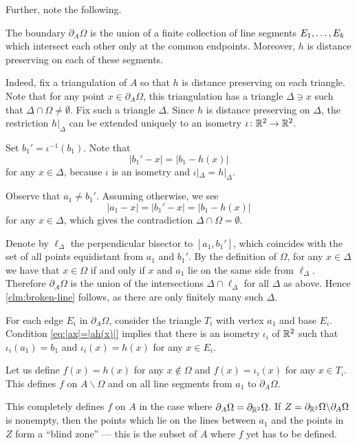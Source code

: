 Further, note the following.
\begin{clm}{}\label{clm:broken-line}
The boundary $\partial_A\Omega$ is the union of a finite collection of line segments
$E_1,\z\dots, E_k$ which intersect each other only at the common endpoints. Moreover, $h$ is distance preserving on each of these segments.
\end{clm}

Indeed, fix a triangulation of $A$ so that $h$ is distance preserving on each triangle.
Note that for any point $x\in \partial_A\Omega$, this triangulation has a triangle $\Delta\ni x$ such that $\Delta\cap\Omega\ne\emptyset$.
Fix such a triangle $\Delta$.
Since $h$ is distance preserving on $\Delta$, 
the restriction $h|_\Delta$ can be extended uniquely to an isometry $\iota\:\RR^2\z\to\RR^2$.

Set $b_1'=\iota^{-1}(b_1)$.
Note that 
\[|b_1'-x|=|b_1-h(x)|\] 
for any $x\in\Delta$, because $\iota$ is an isometry and $\iota|_\Delta = h|_\Delta$.

Observe that $a_1\ne b_1'$.
Assuming otherwise, we see $$|a_1-x|=|b_1'-x|=|b_1-h(x)|$$ for any $x\in\Delta$, which gives the contradiction $\Delta\cap\Omega=\emptyset$.

Denote by $\ell_\Delta$ the perpendicular bisector to $[a_1, b_1']$, which coincides with the set of all points equidistant from $a_1$ and $b_1'$.
By the definition of $\Omega$, for any $x\in \Delta$ we have that
$x\in\Omega$ if and only if $x$ and $a_1$ lie on the same side from $\ell_\Delta$.
Therefore $\partial_A\Omega$ is the union of the intersections $\Delta\cap\ell_\Delta$ for all $\Delta$ as above. 
Hence \ref{clm:broken-line} follows, as there are only finitely many such $\Delta$.

For each edge $E_i$ in  $\partial_A\Omega$, consider the triangle $T_i$ with vertex $a_1$ and base $E_i$.
Condition \ref{eq:|ax|=|ah(x)|} implies that there is an isometry $\iota_i$ of $\mathbb{R}^2$ such that $\iota_i(a_1)= b_1$
and  $\iota_i(x)=h(x)$ for any $x\in E_i$.

Let us define 
$f(x)=h(x)$ for any $x\notin\Omega$
and $f(x)=\iota_i(x)$ for any $x\in T_i$.
This defines $f$ on $A\backslash \Omega$ 
and on all line segments from $a_1$ to $\partial_A\Omega$.

This completely defines $f$ on $A$ in the case where $\partial_{A}\Omega=\partial_{\mathbb{R}^2}\Omega$.
If $Z\z=\partial_{\RR^2}\Omega\backslash\partial_{A}\Omega$ is nonempty, then the points which lie on the lines between $a_1$ and the points in $Z$ 
form a ``blind zone'' --- this is the subset of $A$ where $f$ yet has to be defined.

